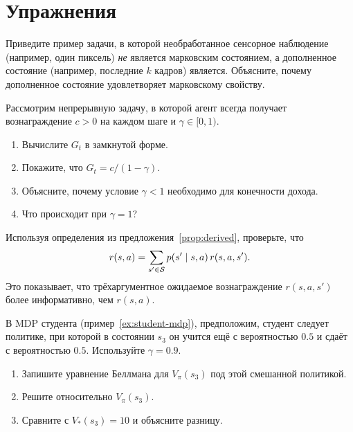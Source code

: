 \section*{Упражнения}

\begin{exercise}
\label{ex:markov-state}
Приведите пример задачи, в которой необработанное сенсорное наблюдение (например, один пиксель) \emph{не} является марковским состоянием, а дополненное состояние (например, последние $k$ кадров) является. Объясните, почему дополненное состояние удовлетворяет марковскому свойству.
\end{exercise}

\begin{exercise}
\label{ex:return-constant}
Рассмотрим непрерывную задачу, в которой агент всегда получает вознаграждение $c > 0$ на каждом шаге и $\gamma \in [0,1)$.
\begin{enumerate}[label=(\alph*)]
  \item Вычислите $G_t$ в замкнутой форме.
  \item Покажите, что $G_t = c/(1-\gamma)$.
  \item Объясните, почему условие $\gamma < 1$ необходимо для конечности дохода.
  \item Что происходит при $\gamma = 1$?
\end{enumerate}
\end{exercise}

\begin{exercise}
\label{ex:q-from-p}
Используя определения из предложения~\ref{prop:derived}, проверьте, что
\[
r(s, a) = \sum_{s' \in \mathcal{S}} p(s' \mid s, a)\, r(s, a, s').
\]
Это показывает, что трёхаргументное ожидаемое вознаграждение $r(s,a,s')$ более информативно, чем $r(s,a)$.
\end{exercise}

\begin{exercise}
\label{ex:action-values-comp}
В MDP студента (пример~\ref{ex:student-mdp}), предположим, студент следует политике, при которой в состоянии $s_3$ он учится ещё с вероятностью $0.5$ и сдаёт с вероятностью $0.5$.  Используйте $\gamma = 0.9$.
\begin{enumerate}[label=(\alph*)]
  \item Запишите уравнение Беллмана для $V_\pi(s_3)$ под этой смешанной политикой.
  \item Решите относительно $V_\pi(s_3)$.
  \item Сравните с $V_*(s_3) = 10$ и объясните разницу.
\end{enumerate}
\end{exercise}

